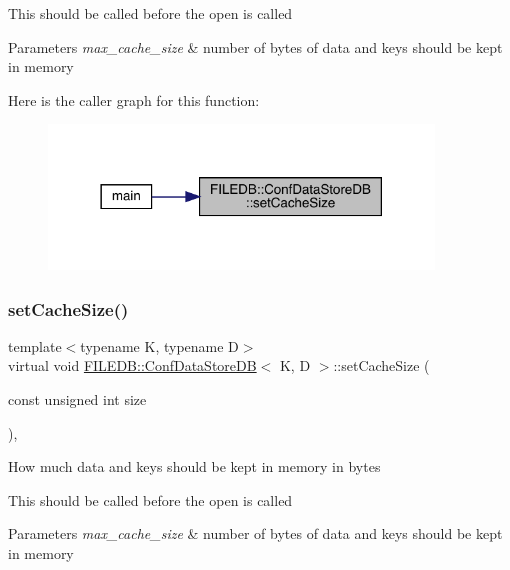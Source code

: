 This should be called before the open is called 
\begin{DoxyParams}{Parameters}
{\em max\+\_\+cache\+\_\+size} & number of bytes of data and keys should be kept in memory \\
\hline
\end{DoxyParams}
Here is the caller graph for this function\+:\nopagebreak
\begin{figure}[H]
\begin{center}
\leavevmode
\includegraphics[width=290pt]{d8/d19/classFILEDB_1_1ConfDataStoreDB_af432d4a9c6dfb21a6ccb1969343cb4fa_icgraph}
\end{center}
\end{figure}
\mbox{\label{classFILEDB_1_1ConfDataStoreDB_af432d4a9c6dfb21a6ccb1969343cb4fa}} 
\subsubsection{\texorpdfstring{setCacheSize()}{setCacheSize()}\hspace{0.1cm}{\footnotesize\ttfamily [2/2]}}
{\footnotesize\ttfamily template$<$typename K, typename D$>$ \\
virtual void \mbox{\hyperlink{classFILEDB_1_1ConfDataStoreDB}{F\+I\+L\+E\+D\+B\+::\+Conf\+Data\+Store\+DB}}$<$ K, D $>$\+::set\+Cache\+Size (\begin{DoxyParamCaption}\item[{const unsigned int}]{size }\end{DoxyParamCaption})\hspace{0.3cm}{\ttfamily [inline]}, {\ttfamily [virtual]}}

How much data and keys should be kept in memory in bytes

This should be called before the open is called 
\begin{DoxyParams}{Parameters}
{\em max\+\_\+cache\+\_\+size} & number of bytes of data and keys should be kept in memory \\
\hline
\end{DoxyParams}
\mbox{\label{classFILEDB_1_1ConfDataStoreDB_aa5fafbdd147d1b66d8fcc6821dc3804f}} 
